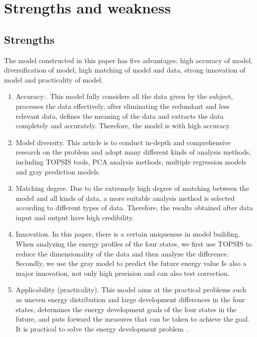 \documentclass[a4paper]{article}
\begin{document}
\section{Strengths and weakness}
\subsection{Strengths}

The model constructed in this paper has five advantages: high accuracy of model, diversification of model, high matching of model and data, strong innovation of model and practicality of model.

\begin{enumerate}
\item Accuracy:. This model fully considers all the data given by the subject, processes the data effectively, after eliminating the redundant and less relevant data, defines the meaning of the data and extracts the data completely and accurately. Therefore, the model is with high accuracy.

\item Model diversity. This article is to conduct in-depth and comprehensive research on the problem and adopt many different kinds of analysis methods, including TOPSIS tools, PCA analysis methods, multiple regression models and gray prediction models.

\item Matching degree. Due to the extremely high degree of matching between the model and all kinds of data, a more suitable analysis method is selected according to different types of data. Therefore, the results obtained after data input and output have high credibility.

\item Innovation. In this paper, there is a certain uniqueness in model building. When analyzing the energy profiles of the four states, we first use TOPSIS to reduce the dimensionality of the data and then analyze the difference. Secondly, we use the gray model to predict the future energy value Is also a major innovation, not only high precision and can also test correction.

\item Applicability (practicality). This model aims at the practical problems such as uneven energy distribution and large development differences in the four states, determines the energy development goals of the four states in the future, and puts forward the measures that can be taken to achieve the goal. It is practical to solve the energy development problem .

\end{enumerate}
\end{document}
